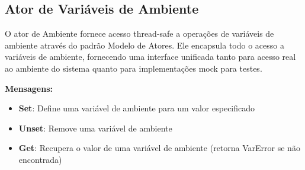 \subsection{Ator de Variáveis de Ambiente}

O ator de Ambiente fornece acesso thread-safe a operações de variáveis de ambiente através do padrão Modelo de Atores. Ele encapsula todo o acesso a variáveis de ambiente, fornecendo uma interface unificada tanto para acesso real ao ambiente do sistema quanto para implementações mock para testes.

\textbf{Mensagens:}

\begin{itemize}
    \item \textbf{Set}: Define uma variável de ambiente para um valor especificado
    \item \textbf{Unset}: Remove uma variável de ambiente
    \item \textbf{Get}: Recupera o valor de uma variável de ambiente (retorna VarError se não encontrada)
\end{itemize}
